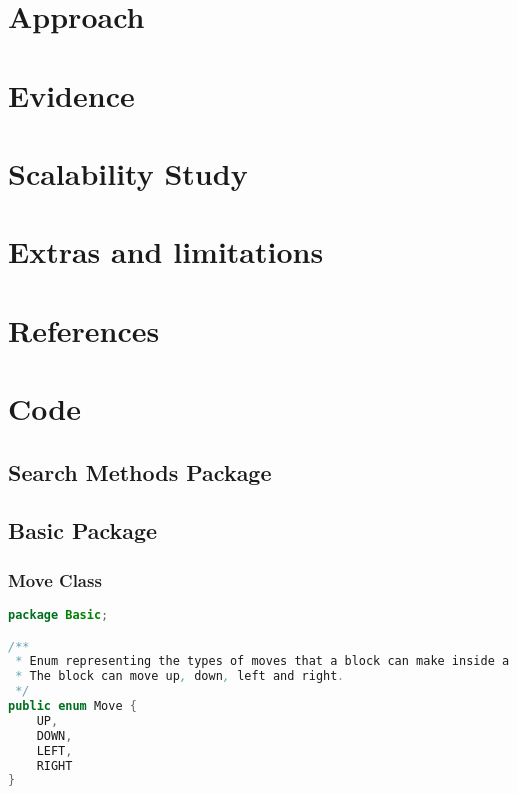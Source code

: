 \documentclass[a4paper, 11pt]{article} %
\begin{document}
\section{Approach}

\section{Evidence}

\section{Scalability Study}

\section{Extras and limitations}

\section{References}

\section{Code}



\subsection{Search Methods Package}

\subsection{Basic Package}

\subsubsection{Move Class}
\begin{lstlisting}[language=java]
package Basic;

/**
 * Enum representing the types of moves that a block can make inside a grid.
 * The block can move up, down, left and right.
 */
public enum Move {
    UP,
    DOWN,
    LEFT,
    RIGHT
}
\end{lstlisting}
\end{document}
